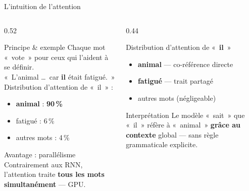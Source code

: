 \documentclass[aspectratio=169, 10pt]{beamer}
\begin{document}
\begin{frame}{L'intuition de l'attention}
  \begin{columns}[T]
    \begin{column}{0.52\textwidth}
      \begin{exampleblock}{Principe \& exemple}
        Chaque mot «~vote~» pour ceux qui l'aident à se définir.\\[2pt]
        «~L'animal \ldots\ car \textbf{il} était fatigué.~»\\[2pt]
        Distribution d'attention de «~il~» :
        \begin{itemize}
          \item \textbf{animal} : \textbf{90\,\%}
          \item fatigué : 6\,\%
          \item autres mots : 4\,\%
        \end{itemize}
      \end{exampleblock}
      \vspace{2pt}
      \begin{alertblock}{Avantage : parallélisme}
        Contrairement aux RNN, l'attention traite
        \textbf{tous les mots simultanément} --- GPU.
      \end{alertblock}
    \end{column}
    \begin{column}{0.44\textwidth}
      \begin{block}{Distribution d'attention de «~\textbf{il}~»}
        \begin{itemize}
          \item[\textcolor{jedy_alert}{\textbf{90\,\%}}]
                \textbf{animal} --- co-référence directe
          \item[\textcolor{jedy_mid}{6\,\%}]
                \textbf{fatigué} --- trait partagé
          \item[4\,\%] autres mots (négligeable)
        \end{itemize}
      \end{block}
      \vspace{2pt}
      \begin{exampleblock}{Interprétation}
        Le modèle «~sait~» que «~il~» réfère à «~animal~»
        \textbf{grâce au contexte} global --- sans règle
        grammaticale explicite.
      \end{exampleblock}
    \end{column}
  \end{columns}
\end{frame}
\end{document}
